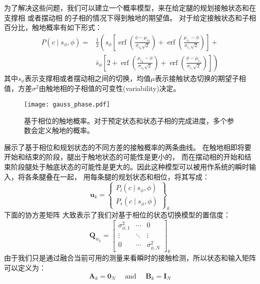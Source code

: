 为了解决这些问题，我们可以建立一个概率模型，来在给定腿的规划接触状态和在支撑相 或者摆动相 的子相的情况下得到触地的期望值。
对于给定接触状态和子相百分比，触地概率有如下形式：
\begin{equation}
    \label{equ:est_contact_prob}
    \begin{aligned}
        P\left(c \mid s_\phi, \phi\right)= & \frac{1}{2}\left(s_\phi\left[\operatorname{erf}\left(\frac{\phi-\mu_{c_0}}{\sigma_{c_0} \sqrt{2}}\right)+\operatorname{erf}\left(\frac{\mu_{c_1}-\phi}{\sigma_{c_1} \sqrt{2}}\right)\right]+\right. \\
        & \left.\bar{s}_\phi\left[2+\operatorname{erf}\left(\frac{\mu_{\bar{c}_0}-\phi}{\sigma_{\bar{c}_0} \sqrt{2}}\right)+\operatorname{erf}\left(\frac{\phi-\mu_{\bar{c}_1}}{\sigma_{\bar{c}_1} \sqrt{2}}\right)\right]\right)
        \end{aligned}
\end{equation}
其中$s_{\phi}$表示支撑相或者摆动相之间的切换，均值$\mu$表示接触状态切换的期望子相值，方差$\sigma^2$由触地相的子相值的可变性(variability)决定。
\begin{figure}[htbp]
    \centering
    \texttt{[image: gauss\_phase.pdf]}
    \caption{\label{fig:gauss_phase}基于相位的触地概率。对于预定状态和状态子相的完成进度，多个参数会定义触地的概率。}
\end{figure}
展示了基于相位和规划状态的不同方差的接触概率的两条曲线。
在触地相即将要开始和结束的阶段，腿出于触地状态的可能性是更小的，
而在摆动相的开始和结束阶段腿处于触底状态的可能性是更大的。因此这种模型可以被用作系统的瞬时输入，将各条腿叠在一起，
用每条腿的规划状态和相位，将其写成：
\begin{equation}
    \label{equ:est_input}
    \boldsymbol{u}_k=\left\{\begin{array}{c}
        P_l\left(c \mid s_\phi, \phi\right) \\
        P_r\left(c \mid s_\phi, \phi\right)
        \end{array}\right\}_k
\end{equation}
下面的协方差矩阵 大致表示了我们对基于相位的状态切换模型的置信度：
\begin{equation}
    \label{equ:est_process_noise}
    \boldsymbol{Q}_{w_k}=\left[\begin{array}{ccc}
        \sigma_{\phi, 1}^2 & \cdots & 0 \\
        \vdots & \ddots & \vdots \\
        0 & \cdots & \sigma_{\phi, N}^2
        \end{array}\right]_k
\end{equation}
由于我们只是通过融合当前可用的测量来看瞬时的接触检测，所以状态和输入矩阵可以定义为：
\begin{equation}
    \label{equ:est_process_matrix}
    \boldsymbol{A}_k=\mathbf{0}_N \quad \text { and } \quad \boldsymbol{B}_k=\mathbf{I}_N
\end{equation}
